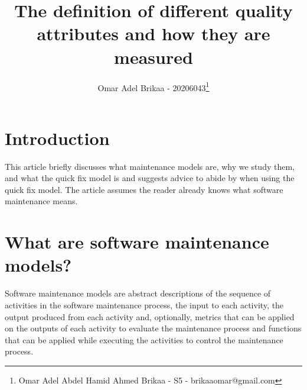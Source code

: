 \documentclass[11pt,a4paper]{article}
\begin{document}
\title{The definition of different quality attributes and how they are measured}
\author{Omar Adel Brikaa - 20206043\thanks{Omar Adel Abdel Hamid Ahmed Brikaa - S5 - brikaaomar@gmail.com}}
\date{}
\maketitle

\tableofcontents

\section{Introduction}
This article briefly discusses what maintenance models are, why we study them,
and what the quick fix model is and suggests advice to abide by when using the quick fix model.
The article assumes the reader already knows what software maintenance means.

\section{What are software maintenance models?}
Software maintenance models are abstract descriptions of
the sequence of activities in the software maintenance process,
the input to each activity, the output produced from each activity
and, optionally, metrics that can be applied on the outputs of each activity to evaluate the maintenance process
and functions that can be applied while executing the activities to control the maintenance process.
\end{document}
